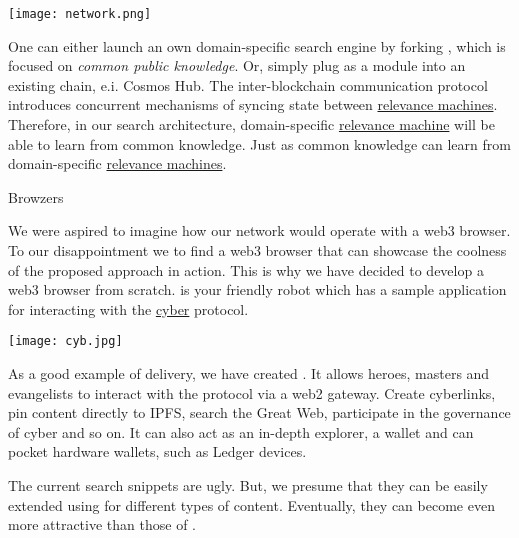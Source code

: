 \documentclass[8pt,oneside]{amsart}
\makeatletter
\newcommand{\linkred}[2]{\href{#1}{\color{red}{#2}}}
\renewcommand\subsection{\@startsection{subsection}
                                    {2}{\z@}
                                    {-3.25ex\@plus -1ex \@minus -.2ex}
                                    {0ex \@plus .2ex}
                                    {\play\Large}
                        }
\newcommand{\titleSection}[1]{\subsection{#1}}
\newenvironment{Figure}
  {\par\medskip\noindent\minipage{\linewidth}}
  {\endminipage\par\medskip}
\makeatother
\begin{document}
\begin{Figure}
    \centering
    \texttt{[image: network.png]}
\end{Figure}

One can either launch an own domain-specific search engine by forking \linkred{https://github.com/cybercongress/go-cyber}{go-cyber}, which is focused on \textit{common public knowledge}. Or, simply plug \linkred{https://github.com/cybercongress/go-cyber}{go-cyber} as a module into an existing chain, e.i. Cosmos Hub. The inter-blockchain communication protocol introduces concurrent mechanisms of syncing state between {\hyperref[relevance-machine]{relevance machines}}. Therefore, in our search architecture, domain-specific {\hyperref[relevance-machine]{relevance machine}} will be able to learn from common knowledge. Just as common knowledge can learn from domain-specific {\hyperref[relevance-machine]{relevance machines}}.

\titleSection{Browzers}\label{browzers}

We were aspired to imagine how our network would operate with a web3 browser. To our disappointment we \linkred{https://github.com/cybercongress/cyb/blob/master/docs/comparison.md}{were not able} to find a web3 browser that can showcase the coolness of the proposed approach in action. This is why we have decided to develop a web3 browser from scratch. \linkred{https://cyb.ai}{Cyb} is your friendly robot which has a sample \linkred{https://cyber.page}{.cyber} application for interacting with the {\hyperref[cyber]{cyber}} protocol.

\begin{Figure}
  \medskip
  \centering
  \texttt{[image: cyb.jpg]}
  \medskip
\end{Figure}

As a good example of delivery, we have created \linkred{https://cyber.page/}{cyber.page}. It allows heroes, masters and evangelists to interact with the protocol via a web2 gateway. Create cyberlinks, pin content directly to IPFS, search the Great Web, participate in the governance of cyber and so on. It can also act as an in-depth explorer, a wallet and can pocket hardware wallets, such as Ledger devices. 

The current search snippets are ugly. But, we presume that they can be easily extended using \linkred{https://github.com/ipld/specs}{IPLD} for different types of content. Eventually, they can become even more attractive than those of \linkred{https://google.com}{Google}.
\end{document}
